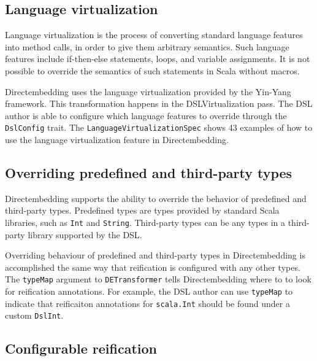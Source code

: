 \subsection{Language virtualization} %
\label{sub:LanguageVirtualization}
Language virtualization is the process of converting standard language features into method calls, in order to give them arbitrary semantics.
Such language features include if-then-else statements, loops, and variable assignments.
It is not possible to override the semantics of such statements in Scala without macros.

Directembedding uses the language virtualization provided by the Yin-Yang~\autocite{jovanovic_yin-yang:_2014} framework.
This transformation happens in the DSLVirtualization pass.
The DSL author is able to configure which language features to override through the \texttt{DslConfig} trait.
The \texttt{LanguageVirtualizationSpec} shows 43 examples of how to use the language virtualization feature in Directembedding.

\subsection{Overriding predefined and third-party types} %
\label{sub:Overridingpredefinedandthirdpartytypes}
Directembedding supports the ability to override the behavior of predefined and third-party types.
Predefined types are types provided by standard Scala libraries, such as \texttt{Int} and \texttt{String}.
Third-party types can be any types in a third-party library supported by the DSL.\

\begin{sloppypar}
    Overriding behaviour of predefined and third-party types in Directembedding is accomplished the same way that reification is configured with any other types.
    The \texttt{typeMap} argument to \texttt{DETransformer} tells Directembedding where to to look for reification annotations.
    For example, the DSL author can use \texttt{typeMap} to indicate that reificaiton annotations for \texttt{scala.Int} should be found under a custom \texttt{DslInt}.
\end{sloppypar}


\subsection{Configurable reification} %
\label{sub:Configurablereification}

